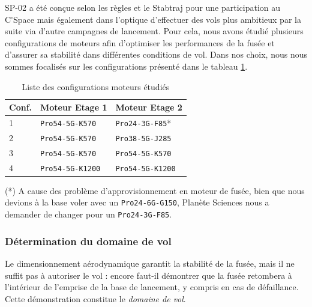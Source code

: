 \hspace*{-\parindent}%
\begin{minipage}{0.5\textwidth}
    SP-02 a été conçue selon les règles et le Stabtraj pour une participation au \gls{C'Space} mais également dans l'optique
    d'effectuer des vols plus ambitieux par la suite via d'autre campagnes de lancement. Pour cela, nous avons étudié plusieurs
    configurations de moteurs afin d'optimiser les performances de la fusée et d'assurer sa stabilité dans différentes conditions
    de vol. Dans nos choix, nous nous sommes focalisés sur les configurations présenté dans le tableau
    \ref{tab:configurations_moteurs}.
\end{minipage}
\hfill
\begin{minipage}{0.45\textwidth}
    \begin{table}[H]
        \centering
        \begin{tabular}{l|l|l}
            \hline
            \textbf{Conf.} & \textbf{Moteur Etage 1} & \textbf{Moteur Etage 2} \\
            \hline
            1 & \verb|Pro54-5G-K570|    & \verb|Pro24-3G-F85|*  \\
            2 & \verb|Pro54-5G-K570|    & \verb|Pro38-5G-J285|  \\
            3 & \verb|Pro54-5G-K570|    & \verb|Pro54-5G-K570|  \\
            4 & \verb|Pro54-5G-K1200|   & \verb|Pro54-5G-K1200| \\
            \hline
        \end{tabular}
        \caption{Liste des configurations moteurs étudiés}
        \label{tab:configurations_moteurs}
    \end{table}
\end{minipage}

(*) A cause des problème d'approvisionnement en moteur de fusée, bien que nous devions à la base voler avec un
\texttt{Pro24-6G-G150}, Planète Sciences nous a demander de changer pour un \texttt{Pro24-3G-F85}.

\vfill

\subsubsection{Détermination du domaine de vol}
\label{subsubsec:domaine_de_vol}

Le dimensionnement aérodynamique garantit la stabilité de la fusée, mais il ne suffit pas à autoriser le vol : encore faut-il
démontrer que la fusée retombera à l'intérieur de l'emprise de la base de lancement, y compris en cas de défaillance. Cette
démonstration constitue le \emph{domaine de vol}.

